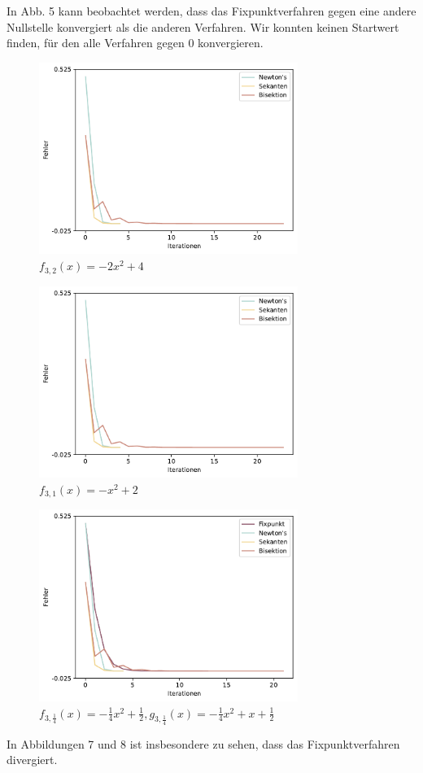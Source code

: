 \documentclass[a4paper,12pt]{article}
\newcommand{\1}{1\hspace{-0,9ex}1}
\begin{document}
In Abb. 5 kann beobachtet werden, dass das Fixpunktverfahren gegen eine andere Nullstelle konvergiert als die anderen Verfahren. Wir konnten keinen Startwert finden, für den alle Verfahren gegen $0$ konvergieren.

\begin{figure}[H]
	\centering
	\includegraphics[width=0.75\textwidth]{plots/error_series_plot(2).pdf}
	\caption{$f_{3,2}(x) = -2x^2 + 4$}
\end{figure}


\begin{figure}[H]
	\centering
	\includegraphics[width=0.75\textwidth]{plots/error_series_plot(3).pdf}
	\caption{$f_{3,1}(x) = -x^2 + 2$}
\end{figure}
\begin{figure}[H]
	\centering
	\includegraphics[width=0.75\textwidth]{plots/error_series_plot(4).pdf}
	\caption{$f_{3,\frac{1}{4}}(x) = -\frac{1}{4}x^2 +\frac{1}{2},  g_{3,\frac{1}{4}}(x)=-\frac{1}{4}x^2 + x + \frac{1}{2}$}
\end{figure}
In Abbildungen 7 und 8 ist insbesondere zu sehen, dass das Fixpunktverfahren divergiert.
\end{document}
